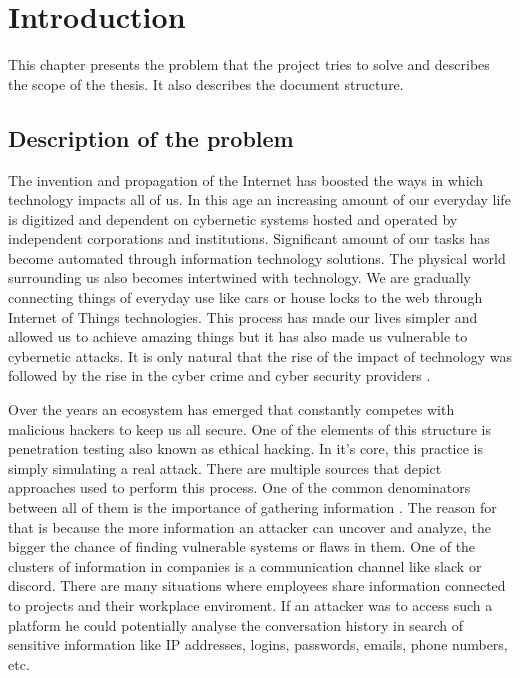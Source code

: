 \documentclass[a4paper,twoside,12pt]{book}
\newcounter{PagesWithoutNumbers}
\begin{document}
\vfill
 
 

\cleardoublepage


\pagestyle{onlyPageNumbers}
\tableofcontents

\setcounter{PagesWithoutNumbers}{\value{page}}
\mainmatter
\pagestyle{PageNumbersChapterTitles}



\chapter{Introduction}

This chapter presents the problem that the project tries to solve and describes the scope of the thesis. It also describes the document structure.

\section{Description of the problem}

The invention and propagation of the Internet has boosted the ways in which technology impacts
all of us. In this age an increasing amount of our everyday life is digitized and dependent 
on cybernetic systems hosted and operated by independent corporations and institutions. Significant
amount of our tasks has become automated through information technology solutions. The physical world 
surrounding us also becomes intertwined with technology. We are gradually connecting things of everyday 
use like cars or house locks to the web through Internet of Things technologies. This process has 
made our lives simpler and allowed us to achieve amazing things but it has also made us vulnerable to 
cybernetic attacks. It is only natural that the rise of the impact of technology was followed 
by the rise in the cyber crime and cyber security providers \cite{bib:articleImportanceOfCybersecurity}. 

Over the years an ecosystem has emerged that constantly competes with malicious hackers to keep us all secure.
One of the elements of this structure is penetration testing also known as ethical hacking. In it's core, 
this practice is simply simulating a real attack. There are multiple sources that depict approaches 
used to perform this process. One of the common denominators between all of them is the importance of 
gathering information \cite{bib:bookEthicalHacking}. The reason for that is because the more information an attacker can uncover and analyze, 
the bigger the chance of finding vulnerable systems or flaws in them. One of the clusters of information 
in companies is a communication channel like slack or discord. There are many situations where employees 
share information connected to projects and their workplace enviroment. If an attacker was to access such a 
platform he could potentially analyse the conversation history in search of sensitive information like IP addresses, 
logins, passwords, emails, phone numbers, etc.
\end{document}
